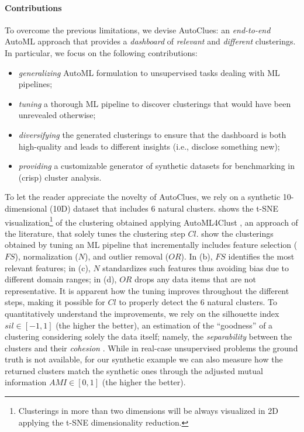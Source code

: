 \paragraph{Contributions} To overcome the previous limitations, we devise AutoClues: an \textit{end-to-end} AutoML approach that provides a \textit{dashboard} of \textit{relevant} and \textit{different} clusterings. In particular, we focus on the following contributions:
\begin{itemize}
    \item \textit{generalizing} AutoML formulation to unsupervised tasks dealing with ML pipelines;
    \item \textit{tuning} a thorough ML pipeline to discover clusterings that would have been unrevealed otherwise;
    \item \textit{diversifying} the generated clusterings to ensure that the dashboard is both high-quality and leads to different insights (i.e., disclose something new);
    \item \textit{providing} a customizable generator of synthetic datasets for benchmarking in (crisp) cluster analysis.
\end{itemize}

To let the reader appreciate the novelty of AutoClues, we rely on a synthetic 10-dimensional (10D) dataset that includes 6 natural clusters.  shows the t-SNE \cite{van2008visualizing} visualization\footnote{Clusterings in more than two dimensions will be always visualized in 2D applying the t-SNE dimensionality reduction.}  of the clustering obtained applying AutoML4Clust \cite{Tschechlov2021}, an approach of the literature, that solely tunes the clustering step $Cl$.  show the clusterings obtained by tuning an ML pipeline that incrementally includes feature selection ($FS$), normalization ($N$), and outlier removal ($OR$). In (b), $FS$ identifies the most relevant features; in (c), $N$ standardizes such features thus avoiding bias due to different domain ranges; in (d), $OR$ drops any data items that are not representative. 
It is apparent how the tuning improves throughout the different steps, making it possible for $Cl$ to properly detect the 6 natural clusters. 
To quantitatively understand the improvements, we rely on the silhouette index $sil \in [-1, 1]$ (the higher the better), an estimation of the ``goodness'' of a clustering considering solely the data itself; namely, the \textit{separability} between the clusters and their \textit{cohesion} \cite{zhu2010clustering}.
While in real-case unsupervised problems the ground truth is not available, for our synthetic example we can also measure how the returned clusters match the synthetic ones through the adjusted mutual information \cite{vinh2009information} $AMI \in [0, 1]$ (the higher the better).

